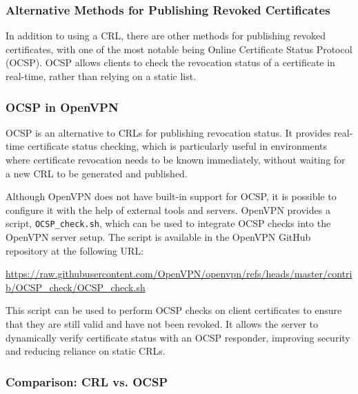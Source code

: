 \subsubsection{Alternative Methods for Publishing Revoked Certificates}

In addition to using a CRL, there are other methods for publishing revoked certificates, with one of the most notable being Online Certificate Status Protocol (OCSP). OCSP allows clients to check the revocation status of a certificate in real-time, rather than relying on a static list.

\subsubsection{OCSP in OpenVPN}

OCSP is an alternative to CRLs for publishing revocation status. It provides real-time certificate status checking, which is particularly useful in environments where certificate revocation needs to be known immediately, without waiting for a new CRL to be generated and published.

Although OpenVPN does not have built-in support for OCSP, it is possible to configure it with the help of external tools and servers. OpenVPN provides a script, \texttt{OCSP\_check.sh}, which can be used to integrate OCSP checks into the OpenVPN server setup. The script is available in the OpenVPN GitHub repository at the following URL: 
    
\url{https://raw.githubusercontent.com/OpenVPN/openvpn/refs/heads/master/contrib/OCSP_check/OCSP_check.sh}


This script can be used to perform OCSP checks on client certificates to ensure that they are still valid and have not been revoked. It allows the server to dynamically verify certificate status with an OCSP responder, improving security and reducing reliance on static CRLs.

\subsubsection{Comparison: CRL vs. OCSP}

